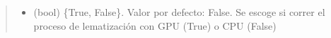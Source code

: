 \documentclass[letterpaper,10pt,openany,spanish]{sphinxmanual}
\begin{document}
\begin{fulllineitems}
\begin{fulllineitems}
\begin{quote}
\begin{description}
\begin{itemize}
\item {} 
 \textendash{} (bool) \{True, False\}. Valor por defecto: False. Se escoge si             correr el proceso de lematización con GPU (True) o CPU (False)

\end{itemize}

\end{description}\end{quote}

\end{fulllineitems}


\end{fulllineitems}

\end{document}

